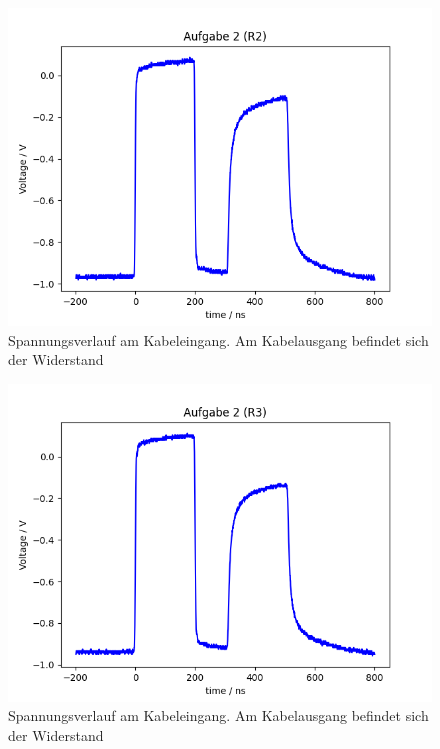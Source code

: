\documentclass{article}
\begin{document}
\begin{figure}[H]
\centering
\caption{Spannungsverlauf am Kabeleingang. Am Kabelausgang befindet sich der Widerstand }
\label{fig:task2_R2}
\includegraphics[scale=0.6]{bilder/task2/task2_R2.png}
\end{figure}



\begin{figure}[H]
\centering
\caption{Spannungsverlauf am Kabeleingang. Am Kabelausgang befindet sich der Widerstand }
\label{fig:task2_R3}
\includegraphics[scale=0.6]{bilder/task2/task2_R3.png}
\end{figure}
\end{document}

